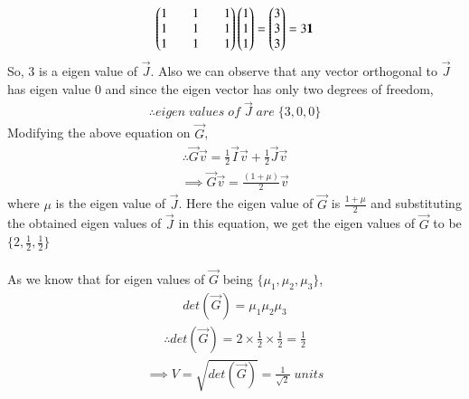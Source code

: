 \documentclass[journal]{IEEEtran}
\begin{document}
\begin{align*}
    \begin{pmatrix}1&&1&&1\\1&&1&&1\\1&&1&&1\end{pmatrix}\begin{pmatrix}1\\1\\1\end{pmatrix}=\begin{pmatrix}3\\3\\3\end{pmatrix}=3\mathbf{1}
\end{align*}
So, 3 is a eigen value of $\vec{J}$. Also we can observe that any vector orthogonal to $\vec{J}$ has eigen value 0 and since the eigen vector has only two degrees of freedom,
\begin{align*}
    \therefore eigen\;values\;of\;\vec{J}\;are\;\{3,0,0\}
\end{align*}
Modifying the above equation on $\vec{G}$,
\begin{align*}
    \therefore \vec{G}\vec{v}=\frac{1}{2}\vec{I}\vec{v}+\frac{1}{2}\vec{J}\vec{v}
\end{align*}
\begin{align*}
    \implies \vec{G}\vec{v}=\frac{(1+\mu)}{2}\vec{v}
\end{align*}
where $\mu$ is the eigen value of $\vec{J}$. Here the eigen value of $\vec{G}$ is $\frac{1+\mu}{2}$ and substituting the obtained eigen values of $\vec{J}$ in this equation, we get the eigen values of $\vec{G}$ to be $\{2,\frac{1}{2},\frac{1}{2}\}$\\
\\
As we know that for eigen values of $\vec{G}$ being $\{\mu_1,\mu_2,\mu_3\}$,
\begin{align*}
    det(\vec{G})=\mu_1\mu_2\mu_3
\end{align*}
\begin{align*}
    \therefore det(\vec{G})=2\times\frac{1}{2}\times\frac{1}{2}=\frac{1}{2}
\end{align*}
\begin{align*}
    \implies V=\sqrt{det(\vec{G})}=\frac{1}{\sqrt{2}} \; units
\end{align*}
\end{document}
